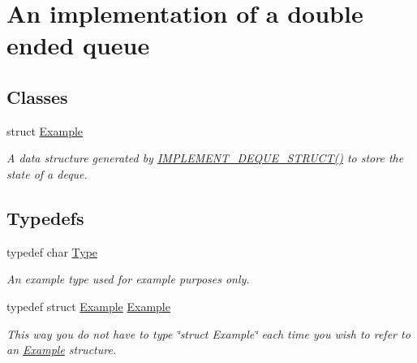 \hypertarget{group__DEQUE}{}\section{An implementation of a double ended queue}
\label{group__DEQUE}
\subsection*{Classes}
\begin{DoxyCompactItemize}
\item 
struct \hyperlink{structExample}{Example}
\begin{DoxyCompactList}\small\item\em A data structure generated by \hyperlink{deque_8h_ad1734634a88d702478c08e26e39dc7b8}{I\+M\+P\+L\+E\+M\+E\+N\+T\+\_\+\+D\+E\+Q\+U\+E\+\_\+\+S\+T\+R\+U\+C\+T()} to store the state of a deque. \end{DoxyCompactList}\end{DoxyCompactItemize}
\subsection*{Typedefs}
\begin{DoxyCompactItemize}
\item 
typedef char \hyperlink{group__DEQUE_gac9c83c2070eb6b5891cf742b90f54c68}{Type}\hypertarget{group__DEQUE_gac9c83c2070eb6b5891cf742b90f54c68}{}\label{group__DEQUE_gac9c83c2070eb6b5891cf742b90f54c68}

\begin{DoxyCompactList}\small\item\em An example type used for example purposes only. \end{DoxyCompactList}\item 
typedef struct \hyperlink{structExample}{Example} \hyperlink{group__DEQUE_ga9edabca2136ac70aa219f7777fdafe9f}{Example}\hypertarget{group__DEQUE_ga9edabca2136ac70aa219f7777fdafe9f}{}\label{group__DEQUE_ga9edabca2136ac70aa219f7777fdafe9f}

\begin{DoxyCompactList}\small\item\em This way you do not have to type \char`\"{}struct Example\char`\"{} each time you wish to refer to an \hyperlink{structExample}{Example} structure. \end{DoxyCompactList}\end{DoxyCompactItemize}
